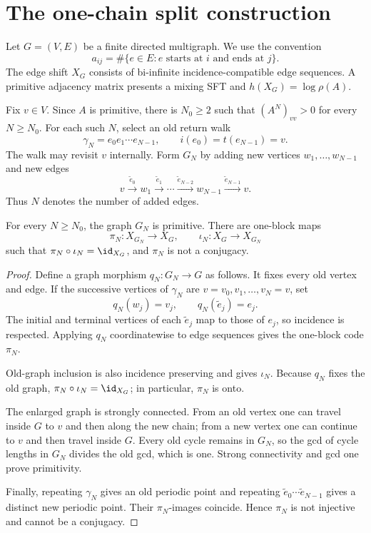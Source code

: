\section{The one-chain split construction}
\label{sec:construction}

Let $G=(V,E)$ be a finite directed multigraph.  We use the convention
\[
 a_{ij}=\#\{e\in E:\text{$e$ starts at $i$ and ends at $j$}\}.
\]
The edge shift $X_G$ consists of bi-infinite incidence-compatible edge
sequences.  A primitive adjacency matrix presents a mixing SFT and
$h(X_G)=\log\rho(A)$.

Fix $v\in V$.  Since $A$ is primitive, there is $N_0\ge2$ such that
$(A^N)_{vv}>0$ for every $N\ge N_0$.  For each such $N$, select an old
return walk
\[
 \gamma_N=e_0e_1\cdots e_{N-1},\qquad
 i(e_0)=t(e_{N-1})=v.
\]
The walk may revisit $v$ internally.  Form $G_N$ by adding new vertices
$w_1,\ldots,w_{N-1}$ and new edges
\[
 v\xrightarrow{\widetilde e_0}w_1
 \xrightarrow{\widetilde e_1}\cdots
 \xrightarrow{\widetilde e_{N-2}}w_{N-1}
 \xrightarrow{\widetilde e_{N-1}}v.
\]
Thus $N$ denotes the number of added edges.

\begin{theorem}
\label{thm:construction}
For every $N\ge N_0$, the graph $G_N$ is primitive.  There are one-block maps
\[
 \pi_N:X_{G_N}\longrightarrow X_G,\qquad
 \iota_N:X_G\longrightarrow X_{G_N}
\]
such that $\pi_N\circ\iota_N=\id_{X_G}$, and $\pi_N$ is not a conjugacy.
\end{theorem}

\begin{proof}
Define a graph morphism $q_N:G_N\to G$ as follows.  It fixes every old vertex
and edge.  If the successive vertices of $\gamma_N$ are
$v=v_0,v_1,\ldots,v_N=v$, set
\[
 q_N(w_j)=v_j,\qquad q_N(\widetilde e_j)=e_j.
\]
The initial and terminal vertices of each $\widetilde e_j$ map to those of
$e_j$, so incidence is respected.  Applying $q_N$ coordinatewise to edge
sequences gives the one-block code $\pi_N$.

Old-graph inclusion is also incidence preserving and gives $\iota_N$.
Because $q_N$ fixes the old graph,
$\pi_N\circ\iota_N=\id_{X_G}$; in particular, $\pi_N$ is onto.

The enlarged graph is strongly connected.  From an old vertex one can travel
inside $G$ to $v$ and then along the new chain; from a new vertex one can
continue to $v$ and then travel inside $G$.  Every old cycle remains in
$G_N$, so the gcd of cycle lengths in $G_N$ divides the old gcd, which is
one.  Strong connectivity and gcd one prove primitivity.

Finally, repeating $\gamma_N$ gives an old periodic point and repeating
$\widetilde e_0\cdots\widetilde e_{N-1}$ gives a distinct new periodic point.
Their $\pi_N$-images coincide.  Hence $\pi_N$ is not injective and cannot be
a conjugacy.
\end{proof}

